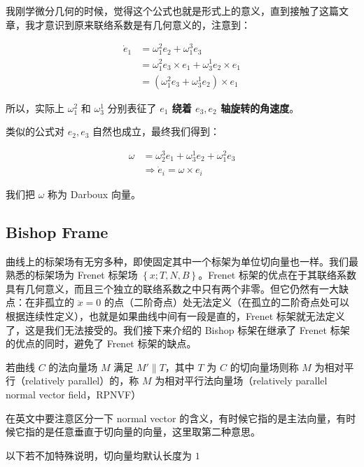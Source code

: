 \documentclass{notes}
\begin{document}
我刚学微分几何的时候，觉得这个公式也就是形式上的意义，直到接触了这篇文章，我才意识到原来联络系数是有几何意义的，注意到：

$$
	\begin{aligned}
		\dot{e}_1 &= \omega_1^2 e_2 + \omega_1^3 e_3 \\
		&= \omega_1^2 e_3 \times e_1 + \omega_3^1 e_2 \times e_1 \\
		&= (\omega_1^2 e_3 + \omega_3^1 e_2) \times e_1
	\end{aligned}
$$

所以，实际上 $\omega_1^2$ 和 $\omega_3^1$ 分别表征了 \textbf{$e_1$ 绕着 $e_3, e_2$ 轴旋转的角速度}。

类似的公式对 $e_2, e_3$ 自然也成立，最终我们得到：

\begin{equation}\label{eq:darboux}
	\begin{aligned}
		\omega &= \omega_2^3 e_1 + \omega_3^1 e_2 + \omega_1^2 e_3 \\
		&\Rightarrow \dot{e}_i = \omega \times e_i
	\end{aligned}
\end{equation}

我们把 $\omega$ 称为 Darboux 向量。

\subsection{Bishop Frame}

曲线上的标架场有无穷多种，即使固定其中一个标架为单位切向量也一样。我们最熟悉的标架场为 Frenet 标架场 $\left\lbrace x; T, N, B \right\rbrace$。Frenet 标架的优点在于其联络系数具有几何意义，而且三个独立的联络系数之中只有两个非零。但它仍然有一大缺点：在非孤立的 $\ddot{x} = 0$ 的点（二阶奇点）处无法定义（在孤立的二阶奇点处可以根据连续性定义），也就是如果曲线中间有一段是直的，Frenet 标架就无法定义了，这是我们无法接受的。我们接下来介绍的 Bishop 标架在继承了 Frenet 标架的优点的同时，避免了 Frenet 标架的缺点。

\begin{definition}
	若曲线 $C$ 的法向量场 $M$ 满足 $M' \parallel T$，其中 $T$ 为 $C$ 的切向量场则称 $M$ 为相对平行（relatively parallel）的，称 $M$ 为相对平行法向量场（relatively parallel normal vector field，RPNVF）
\end{definition}

\begin{remark}
	在英文中要注意区分一下 normal vector 的含义，有时候它指的是主法向量，有时候它指的是任意垂直于切向量的向量，这里取第二种意思。

	以下若不加特殊说明，切向量均默认长度为 $1$
\end{remark}
\end{document}
